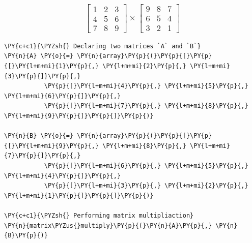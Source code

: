    \hypertarget{beginbmatrix-1-2-3-4-5-6-7-8-9-endbmatrix-times-beginbmatrix-9-8-7-6-5-4-3-2-1-endbmatrix}{%
\subsubsection{\texorpdfstring{\[\begin{bmatrix} 1 & 2 & 3 \\ 4 & 5 & 6 \\ 7 & 8 & 9 \end{bmatrix} \times \begin{bmatrix} 9 & 8 & 7 \\ 6 & 5 & 4 \\ 3 & 2 & 1 \end{bmatrix}\]}{\textbackslash begin\{bmatrix\} 1 \& 2 \& 3 \textbackslash\textbackslash{} 4 \& 5 \& 6 \textbackslash\textbackslash{} 7 \& 8 \& 9 \textbackslash end\{bmatrix\} \textbackslash times \textbackslash begin\{bmatrix\} 9 \& 8 \& 7 \textbackslash\textbackslash{} 6 \& 5 \& 4 \textbackslash\textbackslash{} 3 \& 2 \& 1 \textbackslash end\{bmatrix\}}}\label{beginbmatrix-1-2-3-4-5-6-7-8-9-endbmatrix-times-beginbmatrix-9-8-7-6-5-4-3-2-1-endbmatrix}}

    \begin{tcolorbox}[breakable, size=fbox, boxrule=1pt, pad at break*=1mm,colback=cellbackground, colframe=cellborder]
\begin{Verbatim}[commandchars=\\\{\}]
\PY{c+c1}{\PYZsh{} Declaring two matrices `A` and `B`}
\PY{n}{A} \PY{o}{=} \PY{n}{array}\PY{p}{(}\PY{p}{[}\PY{p}{[}\PY{l+m+mi}{1}\PY{p}{,} \PY{l+m+mi}{2}\PY{p}{,} \PY{l+m+mi}{3}\PY{p}{]}\PY{p}{,}
           \PY{p}{[}\PY{l+m+mi}{4}\PY{p}{,} \PY{l+m+mi}{5}\PY{p}{,} \PY{l+m+mi}{6}\PY{p}{]}\PY{p}{,}
           \PY{p}{[}\PY{l+m+mi}{7}\PY{p}{,} \PY{l+m+mi}{8}\PY{p}{,} \PY{l+m+mi}{9}\PY{p}{]}\PY{p}{]}\PY{p}{)}

\PY{n}{B} \PY{o}{=} \PY{n}{array}\PY{p}{(}\PY{p}{[}\PY{p}{[}\PY{l+m+mi}{9}\PY{p}{,} \PY{l+m+mi}{8}\PY{p}{,} \PY{l+m+mi}{7}\PY{p}{]}\PY{p}{,}
           \PY{p}{[}\PY{l+m+mi}{6}\PY{p}{,} \PY{l+m+mi}{5}\PY{p}{,} \PY{l+m+mi}{4}\PY{p}{]}\PY{p}{,}
           \PY{p}{[}\PY{l+m+mi}{3}\PY{p}{,} \PY{l+m+mi}{2}\PY{p}{,} \PY{l+m+mi}{1}\PY{p}{]}\PY{p}{]}\PY{p}{)}

\PY{c+c1}{\PYZsh{} Performing matrix multipliaction}
\PY{n}{matrix\PYZus{}multiply}\PY{p}{(}\PY{n}{A}\PY{p}{,} \PY{n}{B}\PY{p}{)}
\end{Verbatim}
\end{tcolorbox}

